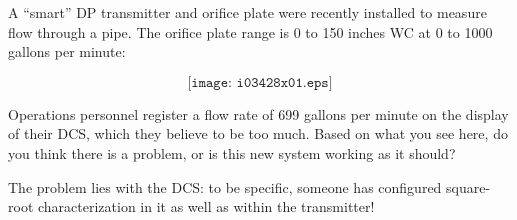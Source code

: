 

A ``smart'' DP transmitter and orifice plate were recently installed to measure flow through a pipe.  The orifice plate range is 0 to 150 inches WC at 0 to 1000 gallons per minute:

$$\texttt{[image: i03428x01.eps]}$$

Operations personnel register a flow rate of 699 gallons per minute on the display of their DCS, which they believe to be too much.  Based on what you see here, do you think there is a problem, or is this new system working as it should?







The problem lies with the DCS: to be specific, someone has configured square-root characterization in it as well as within the transmitter!











